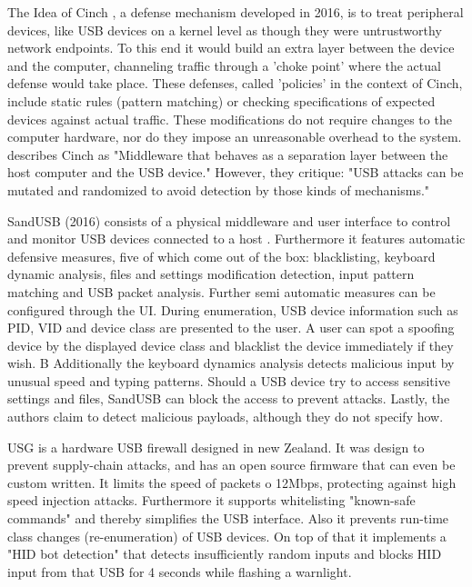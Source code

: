 The Idea of Cinch \cite{angelDefendingMaliciousPeripherals2016}, a defense mechanism developed in 2016, is to treat peripheral devices, like USB devices on a kernel level as though they were untrustworthy network endpoints. To this end it would build an extra layer between the device and the computer, channeling traffic through a 'choke point' where the actual defense would take place. These defenses, called 'policies' in the context of Cinch, include static rules (pattern matching) or checking specifications of expected devices against actual traffic. 
These modifications do not require changes to the computer hardware, nor do they impose an unreasonable overhead to the system.
\cite{farhiMalboardNovelUser2019} describes Cinch as "Middleware that behaves as a separation layer between the host computer and the USB device." However, they critique: "USB attacks can be mutated and randomized to avoid detection by those kinds of mechanisms." \cite[p.~246]{farhiMalboardNovelUser2019}

SandUSB (2016) consists of a physical middleware and user interface to control and monitor USB devices connected to a host \cite{loeSandUSBInstallationfreeSandbox2016}. Furthermore it features automatic defensive measures, five of which come out of the box: blacklisting, keyboard dynamic analysis, files and settings modification detection, input pattern matching and USB packet analysis. Further semi automatic measures can be configured through the UI. 
During enumeration, USB device information such as PID, VID and device class are presented to the user. A user can spot a spoofing device by the displayed device class and blacklist the device immediately if they wish. B
Additionally the keyboard dynamics analysis detects malicious input by unusual speed and typing patterns. Should a USB device try to access sensitive settings and files, SandUSB can block the access to prevent attacks. Lastly, the authors claim to detect malicious payloads, although they do not specify how. 

USG \cite{robertfiskRobertfiskUSG2016} is a hardware USB firewall designed in new Zealand. It was design to prevent supply-chain attacks, and has an open source firmware that can even be custom written. It limits the speed of packets o 12Mbps, protecting against high speed injection attacks. Furthermore it supports whitelisting "known-safe commands" and thereby simplifies the USB interface. Also it prevents run-time class changes (re-enumeration) of USB devices. On top of that it implements a "HID bot detection" that detects insufficiently random inputs and blocks HID input from that USB for 4 seconds while flashing a warnlight. 

